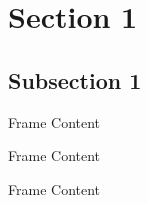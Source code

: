 \documentclass{beamer}
\begin{document}
  \section{Section 1}
  \subsection{Subsection 1}
  \begin{frame}{Frame}
        Content
  \end{frame}
  \begin{frame}{Frame}
        Content
  \end{frame}
  \begin{frame}{Frame}
        Content
  \end{frame}
\end{document}
